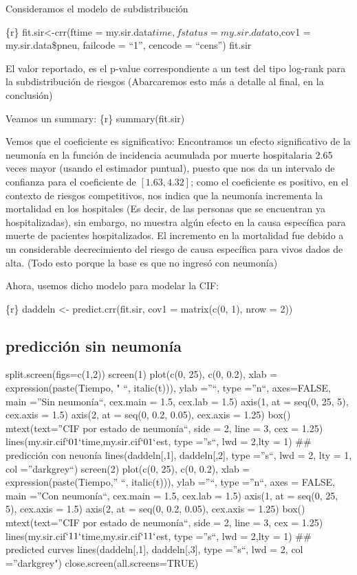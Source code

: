 \documentclass[
]{article}
\begin{document}
Consideramos el modelo de subdistribución

\{r\} fit.sir\textless-crr(ftime =
my.sir.data\(time, fstatus = my.sir.data\)to,cov1 = my.sir.data\$pneu,
failcode = ``1'', cencode = ``cens'') fit.sir

El valor reportado, es el p-value correspondiente a un test del tipo
log-rank para la subdistribución de riesgos (Abarcaremos esto más a
detalle al final, en la conclusión)

Veamos un summary: \{r\} summary(fit.sir)

Vemos que el coeficiente es significativo: Encontramos un efecto
significativo de la neumonía en la función de incidencia acumulada por
muerte hospitalaria 2.65 veces mayor (usando el estimador puntual),
puesto que nos da un intervalo de confianza para el coeficiente de
\([1.63,4.32]\); como el coeficiente es positivo, en el contexto de
riesgos competitivos, nos indica que la neumonía incrementa la
mortalidad en los hospitales (Es decir, de las personas que se
encuentran ya hospitalizadas), sin embargo, no muestra algún efecto en
la causa específica para muerte de pacientes hospitalizados. El
incremento en la mortalidad fue debido a un considerable decrecimiento
del riesgo de causa específica para vivos dados de alta. (Todo esto
porque la base es que no ingresó con neumonía)

Ahora, usemos dicho modelo para modelar la CIF:

\{r\} daddeln \textless- predict.crr(fit.sir, cov1 = matrix(c(0, 1),
nrow = 2))

\hypertarget{predicciuxf3n-sin-neumonuxeda}{%
\subsection{predicción sin
neumonía}\label{predicciuxf3n-sin-neumonuxeda}}

split.screen(figs=c(1,2)) screen(1) plot(c(0, 25), c(0, 0.2), xlab =
expression(paste(Tiempo, " ``, italic(t))), ylab =''``, type =''n``,
axes=FALSE, main =''Sin neumonía``, cex.main = 1.5, cex.lab = 1.5)
axis(1, at = seq(0, 25, 5), cex.axis = 1.5) axis(2, at = seq(0, 0.2,
0.05), cex.axis = 1.25) box() mtext(text=''CIF por estado de neumonía``,
side = 2, line = 3, cex = 1.25)
lines(my.sir.cif\(`0 1`\)time,my.sir.cif\(`0 1`\)est, type =''s``, lwd =
2,lty = 1) \#\# predicción con neuonía lines(daddeln{[},1{]},
daddeln{[},2{]}, type =''s``, lwd = 2, lty = 1, col =''darkgrey``)
screen(2) plot(c(0, 25), c(0, 0.2), xlab = expression(paste(Tiempo,''
``, italic(t))), ylab =''``, type =''n``, axes = FALSE, main =''Con
neumonía``, cex.main = 1.5, cex.lab = 1.5) axis(1, at = seq(0, 25, 5),
cex.axis = 1.5) axis(2, at = seq(0, 0.2, 0.05), cex.axis = 1.25) box()
mtext(text=''CIF por estado de neumonía``, side = 2, line = 3, cex =
1.25) lines(my.sir.cif\(`1 1`\)time,my.sir.cif\(`1 1`\)est, type =''s``,
lwd = 2,lty = 1) \#\# predicted curves lines(daddeln{[},1{]},
daddeln{[},3{]}, type =''s``, lwd = 2, col =''darkgrey")
close.screen(all.screens=TRUE)
\end{document}
